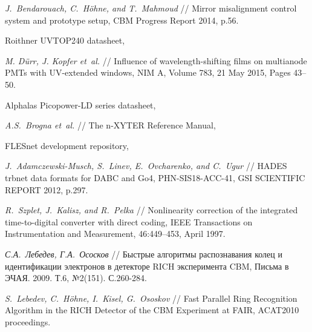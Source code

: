 \begin{thebibliography}{99}
\textit{J.~Bendarouach, C.~H\"{o}hne, and T.~Mahmoud} //
Mirror misalignment control system and prototype setup,
CBM Progress Report 2014, p.56.

Roithner UVTOP240 datasheet,

\textit{M. D\"{u}rr, J. Kopfer et~al.} //
Influence of wavelength-shifting films on multianode PMTs with UV-extended windows,
NIM A, Volume 783, 21 May 2015, Pages 43–50.

Alphalas Picopower-LD series datasheet,


\textit{A.S.~Brogna et~al.} //
The n-XYTER Reference Manual,


FLESnet development repository,

\textit{J.~Adamczewski-Musch, S.~Linev, E.~Ovcharenko, and C.~Ugur} //
HADES trbnet data formats for DABC and Go4,
PHN-SIS18-ACC-41, GSI SCIENTIFIC REPORT 2012, p.297.

\textit{R.~Szplet, J.~Kalisz, and R.~Pelka} //
Nonlinearity correction of the integrated time-to-digital converter with direct coding,
IEEE Transactions on Instrumentation and Measurement, 46:449–453, April 1997.

\textit{С.А.~Лебедев, Г.А.~Ососков} //
Быстрые алгоритмы распознавания колец и идентификации электронов в детекторе RICH эксперимента CBM,
Письма в ЭЧАЯ. 2009. Т.6, №2(151). С.260-284.

\textit{S.~Lebedev, C.~H\"{o}hne, I.~Kisel, G.~Ososkov} //
Fast Parallel Ring Recognition Algorithm in the RICH Detector of the CBM Experiment at FAIR,
ACAT2010 proceedings.


\end{thebibliography}
